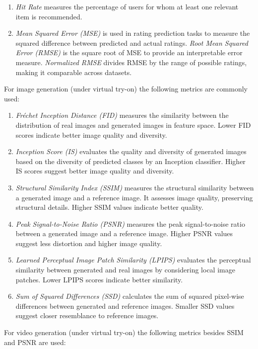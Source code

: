 \begin{enumerate}
			\item \textit{Hit Rate} measures the percentage of users for whom at least one relevant item is recommended.
			\item \textit{Mean Squared Error (MSE)} is used in rating prediction tasks to measure the squared difference between predicted and actual ratings. \textit{Root Mean Squared Error (RMSE)} is the square root of MSE to provide an interpretable error measure. \textit{Normalized RMSE} divides RMSE by the range of possible ratings, making it comparable across datasets.
		\end{enumerate}
		
		For image generation (under virtual try-on) the following metrics are commonly used:

		\begin{enumerate}
			\item \textit{Fréchet Inception Distance (FID)} measures the similarity between the distribution of real images and generated images in feature space. Lower FID scores indicate better image quality and diversity.
			\item \textit{Inception Score (IS)} evaluates the quality and diversity of generated images based on the diversity of predicted classes by an Inception classifier. Higher IS scores suggest better image quality and diversity.
			\item \textit{Structural Similarity Index (SSIM)} measures the structural similarity between a generated image and a reference image. It assesses image quality, preserving structural details. Higher SSIM values indicate better quality.
			\item \textit{Peak Signal-to-Noise Ratio (PSNR)} measures the peak signal-to-noise ratio between a generated image and a reference image. Higher PSNR values suggest less distortion and higher image quality.
			\item \textit{Learned Perceptual Image Patch Similarity (LPIPS)} evaluates the perceptual similarity between generated and real images by considering local image patches. Lower LPIPS scores indicate better similarity.
			\item \textit{Sum of Squared Differences (SSD)} calculates the sum of squared pixel-wise differences between generated and reference images. Smaller SSD values suggest closer resemblance to reference images.
		\end{enumerate}

		For video generation (under virtual try-on) the following metrics besides SSIM and PSNR are used:

